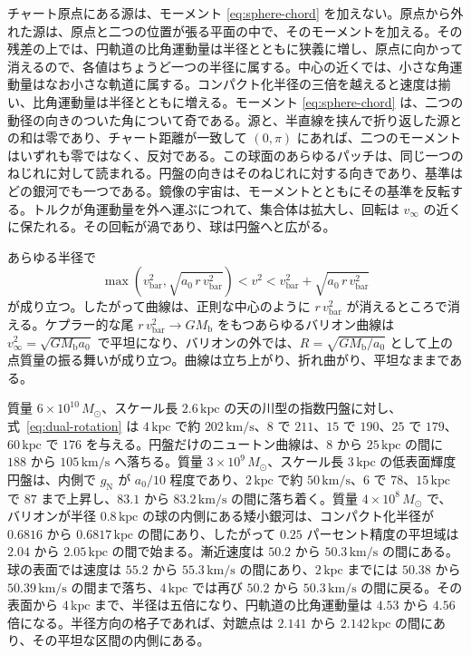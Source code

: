 \documentclass[a4paper]{article}
\begin{document}
チャート原点にある源は、モーメント \eqref{eq:sphere-chord} を加えない。原点から外れた源は、原点と二つの位置が張る平面の中で、そのモーメントを加える。その残差の上では、円軌道の比角運動量は半径とともに狭義に増し、原点に向かって消えるので、各値はちょうど一つの半径に属する。中心の近くでは、小さな角運動量はなお小さな軌道に属する。コンパクト化半径の三倍を越えると速度は揃い、比角運動量は半径とともに増える。モーメント \eqref{eq:sphere-chord} は、二つの動径の向きのついた角について奇である。源と、半直線を挟んで折り返した源との和は零であり、チャート距離が一致して \((0,\pi)\) にあれば、二つのモーメントはいずれも零ではなく、反対である。この球面のあらゆるパッチは、同じ一つのねじれに対して読まれる。円盤の向きはそのねじれに対する向きであり、基準はどの銀河でも一つである。鏡像の宇宙は、モーメントとともにその基準を反転する。トルクが角運動量を外へ運ぶにつれて、集合体は拡大し、回転は \(v_\infty\) の近くに保たれる。その回転が渦であり、球は円盤へと広がる。

あらゆる半径で
\[
\max\!\left(v_{\text{bar}}^2,\sqrt{a_0\,r\,v_{\text{bar}}^2}\right)<v^2<v_{\text{bar}}^2+\sqrt{a_0\,r\,v_{\text{bar}}^2}
\]
が成り立つ。したがって曲線は、正則な中心のように $r\,v_{\text{bar}}^2$ が消えるところで消える。ケプラー的な尾 $r\,v_{\text{bar}}^2\to GM_{\text{b}}$ をもつあらゆるバリオン曲線は $v_\infty^2=\sqrt{GM_{\text{b}}a_0}$ で平坦になり、バリオンの外では、$R=\sqrt{GM_{\text{b}}/a_0}$ として上の点質量の振る舞いが成り立つ。曲線は立ち上がり、折れ曲がり、平坦なままである。

質量 $6\times10^{10}\,M_\odot$、スケール長 $2.6\,\mathrm{kpc}$ の天の川型の指数円盤に対し、式~\eqref{eq:dual-rotation} は $4\,\mathrm{kpc}$ で約 $202\,\mathrm{km/s}$、$8$ で $211$、$15$ で $190$、$25$ で $179$、$60\,\mathrm{kpc}$ で $176$ を与える。円盤だけのニュートン曲線は、$8$ から $25\,\mathrm{kpc}$ の間に $188$ から $105\,\mathrm{km/s}$ へ落ちる。質量 $3\times10^{9}\,M_\odot$、スケール長 $3\,\mathrm{kpc}$ の低表面輝度円盤は、内側で $g_{\text{N}}$ が $a_0/10$ 程度であり、$2\,\mathrm{kpc}$ で約 $50\,\mathrm{km/s}$、$6$ で $78$、$15\,\mathrm{kpc}$ で $87$ まで上昇し、$83.1$ から $83.2\,\mathrm{km/s}$ の間に落ち着く。質量 $4\times10^{8}\,M_\odot$ で、バリオンが半径 $0.8\,\mathrm{kpc}$ の球の内側にある矮小銀河は、コンパクト化半径が $0.6816$ から $0.6817\,\mathrm{kpc}$ の間にあり、したがって $0.25$ パーセント精度の平坦域は $2.04$ から $2.05\,\mathrm{kpc}$ の間で始まる。漸近速度は $50.2$ から $50.3\,\mathrm{km/s}$ の間にある。球の表面では速度は $55.2$ から $55.3\,\mathrm{km/s}$ の間にあり、$2\,\mathrm{kpc}$ までには $50.38$ から $50.39\,\mathrm{km/s}$ の間まで落ち、$4\,\mathrm{kpc}$ では再び $50.2$ から $50.3\,\mathrm{km/s}$ の間に戻る。その表面から $4\,\mathrm{kpc}$ まで、半径は五倍になり、円軌道の比角運動量は $4.53$ から $4.56$ 倍になる。半径方向の格子であれば、対蹠点は $2.141$ から $2.142\,\mathrm{kpc}$ の間にあり、その平坦な区間の内側にある。
\end{document}
